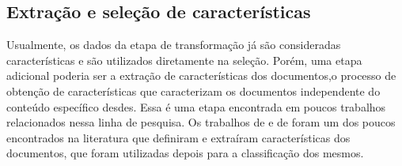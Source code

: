 \documentclass[template.tex]{subfiles}
\begin{document}
\subsection{Extração e seleção de características}


%
%
%
%
%



Usualmente, os dados da etapa de transformação já são consideradas características e são utilizados diretamente na seleção. Porém, uma etapa adicional poderia ser a extração de características dos documentos,o processo de obtenção de características que caracterizam os documentos independente do conteúdo específico desdes. Essa é uma etapa encontrada em poucos trabalhos relacionados nessa linha de pesquisa. Os trabalhos de  e de  foram um dos poucos encontrados na literatura que definiram e extraíram características dos documentos, que foram utilizadas depois para a classificação dos mesmos.
\end{document}
